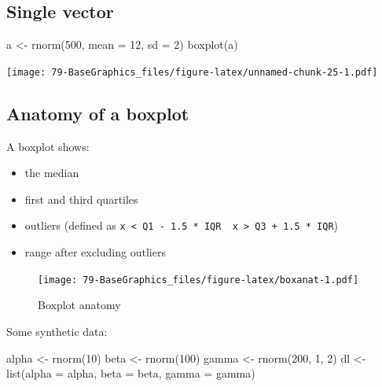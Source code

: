 \documentclass[
]{book}
\newenvironment{Shaded}{\begin{snugshade}}{\end{snugshade}}
\newcommand{\AttributeTok}[1]{\textcolor[rgb]{0.77,0.63,0.00}{#1}}
\newcommand{\DecValTok}[1]{\textcolor[rgb]{0.00,0.00,0.81}{#1}}
\newcommand{\FunctionTok}[1]{\textcolor[rgb]{0.00,0.00,0.00}{#1}}
\newcommand{\NormalTok}[1]{#1}
\newcommand{\OtherTok}[1]{\textcolor[rgb]{0.56,0.35,0.01}{#1}}
\providecommand{\tightlist}{%
  \setlength{\itemsep}{0pt}\setlength{\parskip}{0pt}}
\begin{document}
\hypertarget{single-vector-1}{%
\subsection{Single vector}\label{single-vector-1}}

\begin{Shaded}
\begin{Highlighting}[]
\NormalTok{a }\OtherTok{\textless{}{-}} \FunctionTok{rnorm}\NormalTok{(}\DecValTok{500}\NormalTok{, }\AttributeTok{mean =} \DecValTok{12}\NormalTok{, }\AttributeTok{sd =} \DecValTok{2}\NormalTok{)}
\FunctionTok{boxplot}\NormalTok{(a)}
\end{Highlighting}
\end{Shaded}

\texttt{[image: 79-BaseGraphics\_files/figure-latex/unnamed-chunk-25-1.pdf]}

\hypertarget{anatomy-of-a-boxplot}{%
\subsection{Anatomy of a boxplot}\label{anatomy-of-a-boxplot}}

A boxplot shows:

\begin{itemize}
\tightlist
\item
  the median
\item
  first and third quartiles
\item
  outliers (defined as \texttt{x\ \textless{}\ Q1\ -\ 1.5\ *\ IQR\ \textbar{}\ x\ \textgreater{}\ Q3\ +\ 1.5\ *\ IQR})
\item
  range after excluding outliers
\end{itemize}

\begin{figure}
\centering
\texttt{[image: 79-BaseGraphics\_files/figure-latex/boxanat-1.pdf]}
\caption{\label{fig:boxanat}Boxplot anatomy}
\end{figure}

Some synthetic data:

\begin{Shaded}
\begin{Highlighting}[]
\NormalTok{alpha }\OtherTok{\textless{}{-}} \FunctionTok{rnorm}\NormalTok{(}\DecValTok{10}\NormalTok{)}
\NormalTok{beta }\OtherTok{\textless{}{-}} \FunctionTok{rnorm}\NormalTok{(}\DecValTok{100}\NormalTok{)}
\NormalTok{gamma }\OtherTok{\textless{}{-}} \FunctionTok{rnorm}\NormalTok{(}\DecValTok{200}\NormalTok{, }\DecValTok{1}\NormalTok{, }\DecValTok{2}\NormalTok{)}
\NormalTok{dl }\OtherTok{\textless{}{-}} \FunctionTok{list}\NormalTok{(}\AttributeTok{alpha =}\NormalTok{ alpha, }\AttributeTok{beta =}\NormalTok{ beta, }\AttributeTok{gamma =}\NormalTok{ gamma)}
\end{Highlighting}
\end{Shaded}
\end{document}
